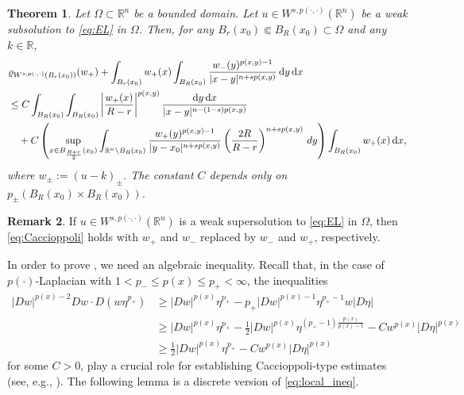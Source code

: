 \documentclass[11pt]{amsart}
\theoremstyle{plain}
\newtheorem{theorem}{Theorem}[section]
\theoremstyle{definition}
\newtheorem{remark}[theorem]{Remark}
\numberwithin{equation}{section}
\renewcommand{\d}{\textnormal{d}}
\newcommand{\R}{\mathbb{R}}
\begin{document}
\begin{theorem} \label{thm:Caccioppoli}
Let $\Omega \subset \R^n$ be a bounded domain. Let $u \in W^{s,p(\cdot, \cdot)}(\mathbb{R}^n)$ be a weak subsolution to \eqref{eq:EL} in $\Omega$. Then, for any $B_r(x_0) \Subset B_R(x_0) \subset \Omega$ and any $k \in \mathbb{R}$,
\begin{equation} \label{eq:Caccioppoli}
\begin{split}
&\varrho_{W^{s,p(\cdot,\cdot)}(B_r(x_0))}(w_+) + \int_{B_r(x_0)} w_+(x) \int_{B_R(x_0)} \frac{w_-(y)^{p(x,y)-1}}{|x-y|^{n+sp(x,y)}} \,\mathrm{d}y \,\mathrm{d}x \\
&\leq C \int_{B_R(x_0)} \int_{B_R(x_0)} \left| \frac{w_+(x)}{R-r} \right|^{p(x,y)} \frac{\mathrm{d}y \,\mathrm{d}x}{|x-y|^{n-(1-s)p(x,y)}} \\
&\quad + C \left( \sup_{x \in B_{\frac{R+r}{2}}(x_0)} \int_{\R^n \setminus B_R(x_0)} \frac{w_+(y)^{p(x,y)-1}}{|y-x_0|^{n+sp(x,y)}} \left( \frac{2R}{R-r} \right)^{n+sp(x,y)} \, \d y \right) \int_{B_R(x_0)} w_+(x) \,\mathrm{d}x,
\end{split}
\end{equation}
where $w_\pm := (u-k)_\pm$. The constant $C$ depends only on $p_\pm(B_R(x_0) \times B_R(x_0))$.
\end{theorem}

\begin{remark}
If $u \in W^{s,p(\cdot, \cdot)}(\mathbb{R}^n)$ is a weak supersolution to \eqref{eq:EL} in $\Omega$, then \eqref{eq:Caccioppoli} holds with $w_+$ and $w_-$ replaced by $w_-$ and $w_+$, respectively.
\end{remark}

In order to prove , we need an algebraic inequality. Recall that, in the case of $p(\cdot)$-Laplacian with $1 < p_- \leq p(x) \leq p_+ < \infty$, the inequalities
\begin{equation} \label{eq:local_ineq}
\begin{split}
|Dw|^{p(x)-2} Dw \cdot D(w\eta^{p_+})
&\geq |Dw|^{p(x)} \eta^{p_+} - p_+ |Dw|^{p(x)-1} \eta^{p_+ -1} w |D\eta| \\
&\geq |Dw|^{p(x)} \eta^{p_+} - \frac{1}{2} |Dw|^{p(x)} \eta^{(p_+-1)\frac{p(x)}{p(x)-1}} - C w^{p(x)} |D\eta|^{p(x)} \\
&\geq \frac{1}{2} |Dw|^{p(x)} \eta^{p_+} - C w^{p(x)} |D\eta|^{p(x)}
\end{split}
\end{equation}
for some $C > 0$, play a crucial role for establishing Caccioppoli-type estimates (see, e.g., \cite{FZ99}). The following lemma is a discrete version of \eqref{eq:local_ineq}.
\end{document}
